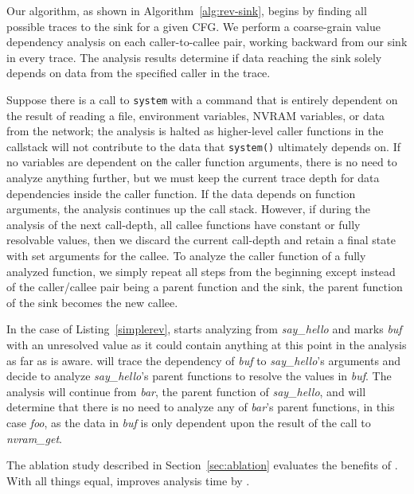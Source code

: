 Our \rev algorithm, as shown in Algorithm~\ref{alg:rev-sink}, begins by finding all possible traces to the sink for a given CFG.
We perform a coarse-grain value dependency analysis on each caller-to-callee pair, working backward from our sink in every trace.
The analysis results determine if data reaching the sink solely depends on data from the specified caller in the trace.

Suppose there is a call to \texttt{system} with a command that is entirely dependent on the result of reading a file, environment variables, NVRAM variables, or data from the network; the analysis is halted as higher-level caller functions in the callstack will not contribute to the data that \texttt{system()} ultimately depends on.
If no variables are dependent on the caller function arguments, there is no need to analyze anything further, but we must keep the current trace depth for data dependencies inside the caller function.
If the data depends on function arguments, the analysis continues up the call stack.
However, if during the analysis of the next call-depth, all callee functions have constant or fully resolvable values, then we discard the current call-depth and retain a final state with set arguments for the callee.
To analyze the caller function of a fully analyzed function, we simply repeat all steps from the beginning except instead of the caller/callee pair being a parent function and the sink, the parent function of the sink becomes the new callee.


In the case of Listing~\ref{simplerev}, \rda starts analyzing from \textit{say\_hello} and marks \textit{buf} with an unresolved value as it could contain anything at this point in the analysis as far as \rda is aware.
\rda will trace the dependency of \textit{buf} to \textit{say\_hello}'s arguments and decide to analyze \textit{say\_hello}'s parent functions to resolve the values in \textit{buf}.
The analysis will continue from \textit{bar}, the parent function of \textit{say\_hello}, and \rda will determine that there is no need to analyze any of \textit{bar}'s parent functions, in this case \textit{foo}, as the data in \textit{buf} is only dependent upon the result of the call to \textit{nvram\_get}.

The ablation study described in Section~\ref{sec:ablation} evaluates the benefits of \rev.
With all things equal, \rev improves analysis time by \tracePercentage.
